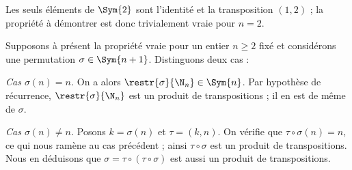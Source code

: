 
Les seuls éléments de $\Sym{2}$ sont l'identité et la transposition $(1, 2)$ ; la propriété à démontrer est donc trivialement vraie pour $n = 2$.

Supposons à présent la propriété vraie pour un entier $n \geq 2$ fixé et considérons une permutation $\sigma\in\Sym{n + 1}$.
Distinguons deux cas :

\emph{Cas $\sigma(n) = n$.}
On a alors $\restr{\sigma}{\N_n}\in\Sym{n}$.
Par hypothèse de récurrence, $\restr{\sigma}{\N_n}$ est un produit de transpositions ; il en est de même de $\sigma$.

\emph{Cas $\sigma(n) \neq n$.}
Posons $k = \sigma(n)$ et $\tau = (k, n)$.
On vérifie que $\tau\circ\sigma(n) = n$, ce qui nous ramène au cas précédent ; ainsi $\tau\circ\sigma$ est un produit de transpositions.
Nous en déduisons que $\sigma = \tau\circ(\tau\circ\sigma)$ est aussi un produit de transpositions.
